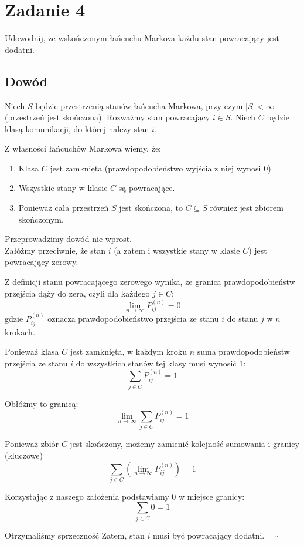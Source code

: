 \section{Zadanie 4}
Udowodnij, że wskończonym łańcuchu Markova każdu stan powracający jest dodatni.

\subsection*{Dowód}
Niech \(S\) będzie przestrzenią stanów łańcucha Markowa, przy czym \(|S| < \infty\) (przestrzeń jest skończona).
Rozważmy stan powracający \(i \in S\). Niech \(C\) będzie klasą komunikacji, do której należy stan \(i\).

Z własności łańcuchów Markowa wiemy, że:
\begin{enumerate}
	\item Klasa \(C\) jest zamknięta (prawdopodobieństwo wyjścia z niej wynosi 0).
	\item Wszystkie stany w klasie \(C\) są powracające.
	\item Ponieważ cała przestrzeń \(S\) jest skończona, to \(C \subseteq S\) również jest zbiorem skończonym.
\end{enumerate}

Przeprowadzimy dowód nie wprost. \\
Załóżmy przeciwnie, że stan \(i\) (a zatem i wszystkie stany w klasie \(C\)) jest powracający zerowy.

Z definicji stanu powracającego zerowego wynika,
że granica prawdopodobieństw przejścia dąży do zera, czyli dla każdego \(j \in C\):
\[
	\lim_{n \to \infty} P_{ij}^{(n)} = 0
\]
gdzie \(P_{ij}^{(n)}\) oznacza prawdopodobieństwo przejścia ze stanu \(i\) do stanu \(j\) w \(n\) krokach.

Ponieważ klasa \(C\) jest zamknięta, w każdym kroku \(n\) suma prawdopodobieństw przejścia ze stanu \(i\) do wszystkich stanów tej klasy musi wynosić 1:
\[
	\sum_{j \in C} P_{ij}^{(n)} = 1
\]

Obłóżmy to granicą:
\[ \lim_{n \to \infty} \sum_{j \in C} P_{ij}^{(n)} = 1 \]

Ponieważ zbiór \(C\) jest skończony,
możemy zamienić kolejność sumowania i granicy (kluczowe)
\[ \sum_{j \in C} \left( \lim_{n \to \infty} P_{ij}^{(n)} \right) = 1 \]

Korzystając z naszego założenia podstawiamy \(0\) w miejsce granicy:
\[ \sum_{j \in C} 0 = 1 \]

Otrzymaliśmy sprzeczność
Zatem, stan \(i\) musi być powracający dodatni. \ \  \(\square\)
